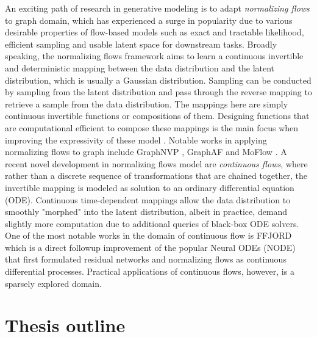 An exciting path of research in generative modeling is to adapt
\textit{normalizing flows} to graph domain, which has experienced a surge in
popularity due to various desirable properties of flow-based models such as
exact and tractable likelihood, efficient sampling and usable latent space for
downstream tasks. Broadly speaking, the normalizing flows framework aims to
learn a continuous invertible and deterministic mapping between the data
distribution and the latent distribution, which is usually a Gaussian
distribution. Sampling can be conducted by sampling from the latent distribution
and pass through the reverse mapping to retrieve a sample from the data
distribution. The mappings here are simply continuous invertible functions or
compositions of them. Designing functions that are computational efficient to
compose these mappings is the main focus when improving the expressivity of
these model \cite{kobyzevNormalizingFlowsIntroduction2021}. Notable works in
applying normalizing flows to graph include GraphNVP
\cite{madhawaGraphNVPInvertibleFlow2019}, GraphAF
\cite{shiGraphAFFlowbasedAutoregressive2020} and MoFlow
\cite{zangMoFlowInvertibleFlow2020}. A recent novel development in normalizing
flows model are \textit{continuous flows}, where rather than a discrete sequence
of transformations that are chained together, the invertible mapping is modeled
as solution to an ordinary differential equation (ODE). Continuous
time-dependent mappings allow the data distribution to smoothly "morphed" into
the latent distribution, albeit in practice, demand slightly more computation
due to additional queries of black-box ODE solvers. One of the most notable
works in the domain of continuous flow is FFJORD
\cite{grathwohlFFJORDFreeformContinuous2018} which is a direct followup
improvement of the popular Neural ODEs (NODE)
\cite{chenNeuralOrdinaryDifferential2019} that first formulated
residual networks and normalizing flows as continuous differential processes.
Practical applications of continuous flows, however, is a sparsely explored
domain.

\section{Thesis outline}

